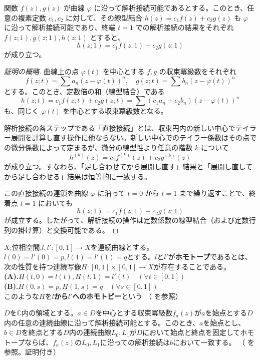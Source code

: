 \begin{proposition}[解析接続の線型性]\label{prop:analytic_linear}
    関数 $f(z), g(z)$ が曲線 $\varphi$ に沿って解析接続可能であるとする。このとき、任意の複素定数 $c_1, c_2$ に対して、その線型結合 $h(z) = c_1f(z) + c_2g(z)$ も $\varphi$ に沿って解析接続可能であり、終端 $t=1$ での解析接続の結果をそれぞれ $f(z;1), g(z;1), h(z;1)$ とすると、
    $$ h(z;1) = c_1f(z;1) + c_2g(z;1) $$
    が成り立つ。
\end{proposition}

\begin{proof}[証明の概略]
    曲線上の点 $\varphi(t)$ を中心とする $f, g$ の収束冪級数をそれぞれ
    $$ f(z; t) = \sum a_n (z - \varphi(t))^n, \quad g(z; t) = \sum b_n (z - \varphi(t))^n $$
    とする。このとき、定数倍の和（線型結合）である
    $$ h(z; t) = c_1f(z; t) + c_2g(z; t) = \sum (c_1a_n + c_2b_n)(z - \varphi(t))^n $$
    も、同じく $\varphi(t)$ を中心とする収束冪級数となる。
    
    解析接続の各ステップである「直接接続」とは、収束円内の新しい中心でテイラー展開を計算し直す操作に他ならない。新しい中心でのテイラー係数はその点での微分係数によって定まるが、微分の線型性より任意の階数 $k$ について
    $$ h^{(k)}(z) = c_1f^{(k)}(z) + c_2g^{(k)}(z) $$
    が成り立つ。すなわち、「足し合わせてから展開し直す」結果と「展開し直してから足し合わせる」結果は恒等的に一致する。
    
    この直接接続の連鎖を曲線 $\varphi$ に沿って $t=0$ から $t=1$ まで繰り返すことで、終着点 $t=1$ においても
    $$ h(z; 1) = c_1f(z; 1) + c_2g(z; 1) $$
    が成立する。したがって、解析接続の操作は定数係数の線型結合（および定数行列の掛け算）と交換可能である。
\end{proof}
\begin{definition}[ホモトープ]\label{def:homotope}
    $X$:位相空間,$l,l':[0,1]\to X$を連続曲線とする。$l(0)=l'(0)=p,l(1)=l'(1)=q$とする。$l$と$l'$が\textbf{ホモトープ}であるとは、次の性質を持つ連続写像$H:[0,1]\times[0,1]\to X$が存在することである。\\
    \textbf{(A).}$H(t,0)=l(t),H(t,1)=l'(t)\quad (\forall t \in[0,1])$\\
    \textbf{(B).}$H(0,s)=p,H(1,s)=q \quad  (\forall s \in[0,1])$\\
    このような$H$を\textbf{$l$から$l'$へのホモトピー}という
    （\cite[p.121 定義9.1]{book:matsumoto} を参照）
\end{definition}
\begin{theorem}[一価性定理]\label{thm:monodromy}
    $D$を$\mathbb{C}$内の領域とする。$a\in D$を中心とする収束冪級数$f_{a}(z)$が$a$を始点とする$D$内の任意の連続曲線に沿って解析接続可能とする。このとき、$a$を始点とし、$b\in D$を終点とする$D$内の連続曲線$L_{0},L_{1}$が$D$において始点と終点を固定してホモトープならば、$f_{a}(z)$の$L_{0},L_{1}$に沿っての解析接続は$b$において一致する。
    （\cite[p.110 定理22.2]{book:kimura} を参照。証明付き）
\end{theorem}
